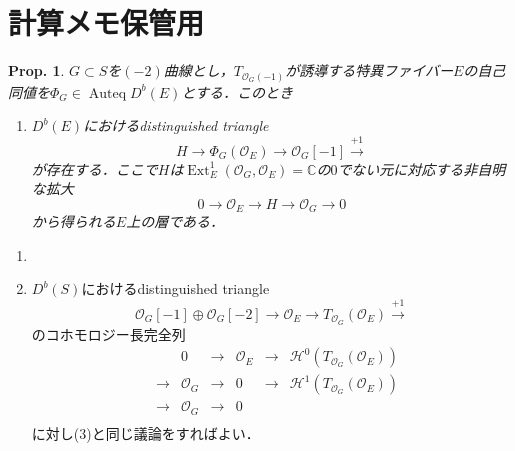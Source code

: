 \documentclass[uplatex,a4paper,11pt,dvipdfmx]{jsarticle}
\makeatletter
\theoremstyle{mystyle} %
\newtheorem{proposition}[theorem]{Prop.}
\renewenvironment{proof}[1][\proofname]{\par
 \pushQED{\qed}%
 \normalfont \topsep6\p@\@plus6\p@\relax
 \trivlist
 \item[\hskip\labelsep
 \itshape
 {\bf\underline{#1}}]\ignorespaces
}{%
 \popQED\endtrivlist\@endpefalse
}
\DeclareMathOperator{\Auteq}{Auteq}\DeclareMathOperator{\Coh}{Coh}
\DeclareMathOperator{\Ext}{Ext}
\makeatother
\begin{document}
\section{計算メモ保管用}
\begin{proposition}
	$G \subset S$を$(-2)$曲線とし，$T_{\mathcal{O}_G(-1)}$が誘導する特異ファイバー$E$の自己同値を$\Phi_G \in \Auteq D^b(E)$とする．このとき
	\begin{enumerate}
		\item $D^b(E)$におけるdistinguished triangle$$H\to \Phi_G(\mathcal{O}_E)\to \mathcal{O}_G[-1] \xrightarrow{+1} $$が存在する．ここで$H$は$\Ext^1_E(\mathcal{O}_G, \mathcal{O}_E) = \mathbb{C}$の$0$でない元に対応する非自明な拡大$$0 \to \mathcal{O}_E \to H \to \mathcal{O}_G \to 0$$から得られる$E$上の層である．
	\end{enumerate}
\end{proposition}
\begin{proof}
	\begin{enumerate}
		\item \item $D^b(S)$におけるdistinguished triangle
		      $$ \mathcal{O}_G[-1] \oplus \mathcal{O}_G[-2] \to \mathcal{O}_E \to T_{\mathcal{O}_G}(\mathcal{O}_E)\xrightarrow{+1}$$のコホモロジー長完全列
		      \[
			      \begin{array}{ccccccc}
				       &     & 0             & \to & \mathcal{O}_E & \to & \mathcal{H}^{0}(T_{\mathcal{O}_G}(\mathcal{O}_E)) \\

				       & \to & \mathcal{O}_G & \to & 0             & \to & \mathcal{H}^1(T_{\mathcal{O}_G}(\mathcal{O}_E))   \\
				       & \to & \mathcal{O}_G & \to & 0             &     &                                                   \\
			      \end{array}
		      \]
		      に対し(3)と同じ議論をすればよい．
	\end{enumerate}
\end{proof}
\end{document}
